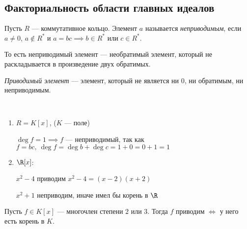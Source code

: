 \subsection{Факториальность области главных идеалов}

\begin{defn}
    Пусть $R$ --- коммутативное кольцо.
    Элемент $a$ называется \emph{неприводимым}, если $a \neq 0$, $a \notin R^*$ и $a = bc \implies b \in R^*$ или $c \in R^*$.

    То есть неприводимый элемент --- необратимый элемент, который не раскладывается в произведение двух обратимых. 
\end{defn}

\begin{defn}
    \emph{Приводимый элемент} --- элемент, который не является ни $0$, ни обратимым, ни неприводимым.
\end{defn}

\begin{examples}~

    \begin{enumerate}
        \item $R = K[x]$, ($K$ --- поле)
        
        $\deg f = 1 \implies f$ --- неприводимый, так как $f = bc,~ \deg f = \deg b + \deg c = 1 + 0 = 0 + 1 = 1$

        \item $\R[x]$: 
        
        $x^2 - 4$ приводим $x^2 - 4 = (x - 2)(x + 2)$
    
        $x^2 + 1$ неприводим, иначе имел бы корень в $\R$
    \end{enumerate}
\end{examples}

\begin{lemma}
    
    Пусть $f \in K[x]$ --- многочлен степени $2$ или $3$. Тогда $f$ приводим $\iff$ у него есть корень в $K$.
\end{lemma}

